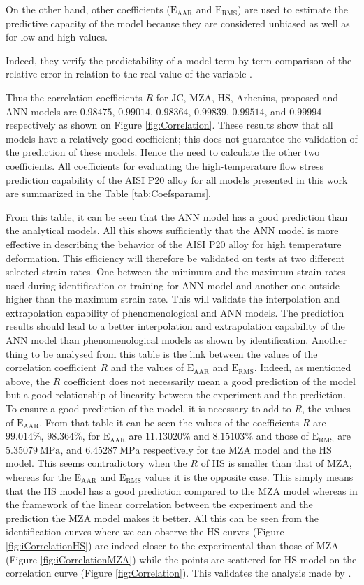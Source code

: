 \documentclass[twoside,english,1p,final,sort&compress]{elsarticle}
\theoremstyle{plain}
\newcommand{\RMSE}{\text{E}_\text{RMS}}
\newcommand{\AARE}{\text{E}_\text{AAR}}
\begin{document}
On the other hand, other coefficients ($\AARE$ and $\RMSE$) are used to estimate the predictive capacity of the model because they are considered unbiased as well as for low and high values.

Indeed, they verify the predictability of a model term by term comparison of the relative error in relation to the real value of the variable \cite{Srinivasulu-2006}.

Thus the correlation coefficients $R$ for JC, MZA, HS, Arhenius, proposed and ANN models are $0.98475$,  $0.99014$,  $0.98364$, $0.99839$, $0.99514$, and $0.99994$ respectively as shown on Figure \ref{fig:Correlation}.
These results show that all models have a relatively good coefficient; this does not guarantee the validation of the prediction of these models.
Hence the need to calculate the other two coefficients.
All coefficients for evaluating the high-temperature flow stress prediction capability of the AISI P20 alloy for all models presented in this work are summarized in the Table \ref{tab:Coefsparams}.

From this table, it can be seen that the ANN model has a good prediction than the analytical models.
All this shows sufficiently that the ANN model is more effective in describing the behavior of the AISI P20 alloy for high temperature deformation.
This efficiency will therefore be validated on tests at two different selected strain rates.
One between the minimum and the maximum strain rates used during identification or training for ANN model and another one outside higher than the maximum strain rate.
This will validate the interpolation and extrapolation capability of phenomenological and ANN models.
The prediction results should lead to a better interpolation and extrapolation capability of the ANN model than phenomenological models as shown by identification.
Another thing to be analysed from this table is the link between the values of the correlation coefficient $R$ and the values of $\AARE$ and $\RMSE$.
Indeed, as mentioned above, the $R$ coefficient does not necessarily mean a good prediction of the model but a good relationship of linearity between the experiment and the prediction.
To ensure a good prediction of the model, it is necessary to add to $R$, the values of $\AARE$.
From that table it can be seen the values of the coefficients $R$ are $99.014\%$, $98.364\%$, for $\AARE$ are $11.13020\%$ and $8.15103\%$ and those of $\RMSE$ are $5.35079\ \text{MPa}$, and $6.45287\ \text{MPa}$ respectively for the MZA model and the HS model.
This seems contradictory when the $R$ of HS is smaller than that of MZA, whereas for the $\AARE$ and $\RMSE$ values it is the opposite case.
This simply means that the HS model has a good prediction compared to the MZA model whereas in the framework of the linear correlation between the experiment and the prediction the MZA model makes it better.
All this can be seen from the identification curves where we can observe the HS curves (Figure \ref{fig:iCorrelationHS}) are indeed closer to the experimental than those of MZA (Figure \ref{fig:iCorrelationMZA}) while the points are scattered for HS model on the correlation curve (Figure \ref{fig:Correlation}).
This validates the analysis made by \cite{Phaniraj-2003, Srinivasulu-2006}.
\end{document}
